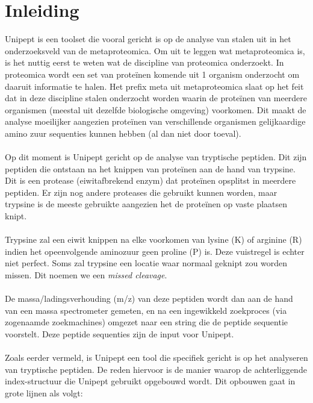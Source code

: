 \documentclass[11pt,dutch,faculty=we,layout=titlefont,underline=false,titleUppercase=true,titleUnderline=true]{ugent2016-report}
\begin{document}
    \section{Inleiding}\label{sec:inleiding}
    Unipept is een toolset die vooral gericht is op de analyse van stalen uit in het onderzoeksveld van de metaproteomica.
    Om uit te leggen wat metaproteomica is, is het nuttig eerst te weten wat de discipline van proteomica onderzoekt.
    In proteomica wordt een set van proteïnen komende uit 1 organism onderzocht om daaruit informatie te halen.
    Het prefix meta uit metaproteomica slaat op het feit dat in deze discipline stalen onderzocht worden waarin de proteïnen van meerdere organismen (meestal uit dezelfde biologische omgeving) voorkomen.
    Dit maakt de analyse moeilijker aangezien proteïnen van verschillende organismen gelijkaardige amino zuur sequenties kunnen hebben (al dan niet door toeval).
    \\ \\
    Op dit moment is Unipept gericht op de analyse van tryptische peptiden.
    Dit zijn peptiden die ontstaan na het knippen van proteïnen aan de hand van trypsine.
    Dit is een protease (eiwitafbrekend enzym) dat proteïnen opsplitst in meerdere peptiden.
    Er zijn nog andere proteases die gebruikt kunnen worden, maar trypsine is de meeste gebruikte aangezien het de proteïnen op vaste plaatsen knipt.
    \\ \\
    Trypsine zal een eiwit knippen na elke voorkomen van lysine (K) of arginine (R) indien het opeenvolgende aminozuur geen proline (P) is.
    Deze vuistregel is echter niet perfect.
    Soms zal trypsine een locatie waar normaal geknipt zou worden missen.
    Dit noemen we een \textit{missed cleavage}.
    \\ \\
    De massa/ladingsverhouding (m/z) van deze peptiden wordt dan aan de hand van een massa spectrometer gemeten, en na een ingewikkeld zoekproces (via zogenaamde zoekmachines) omgezet naar een string die de peptide sequentie voorstelt.
    Deze peptide sequenties zijn de input voor Unipept.
    \\ \\
    Zoals eerder vermeld, is Unipept een tool die specifiek gericht is op het analyseren van tryptische peptiden.
    De reden hiervoor is de manier waarop de achterliggende index-structuur die Unipept gebruikt opgebouwd wordt.
    Dit opbouwen gaat in grote lijnen als volgt:
\end{document}
